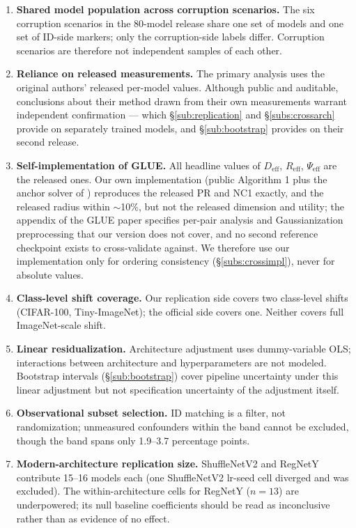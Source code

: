 \documentclass[10pt]{article} %
\newcommand{\srcref}[1]{\S\ref{#1}}
\begin{document}
\begin{enumerate}
\item \textbf{Shared model population across corruption scenarios.} The six corruption scenarios in the 80-model release share one set of models and one set of ID-side markers; only the corruption-side labels differ. Corruption scenarios are therefore not independent samples of each other.
\item \textbf{Reliance on released measurements.} The primary analysis uses the original authors' released per-model values. Although public and auditable, conclusions about their method drawn from their own measurements warrant independent confirmation --- which \srcref{sub:replication} and \srcref{subs:crossarch} provide on separately trained models, and \srcref{sub:bootstrap} provides on their second release.
\item \textbf{Self-implementation of GLUE.} All headline values of $D_{\mathrm{eff}}$, $R_{\mathrm{eff}}$, $\Psi_{\mathrm{eff}}$ are the released ones. Our own implementation (public Algorithm 1 plus the anchor solver of \citet{chung2018classification}) reproduces the released PR and NC1 exactly, and the released radius within $\sim$10\%, but not the released dimension and utility; the appendix of the GLUE paper specifies per-pair analysis and Gaussianization preprocessing that our version does not cover, and no second reference checkpoint exists to cross-validate against. We therefore use our implementation only for ordering consistency (\srcref{subs:crossimpl}), never for absolute values.
\item \textbf{Class-level shift coverage.} Our replication side covers two class-level shifts (CIFAR-100, Tiny-ImageNet); the official side covers one. Neither covers full ImageNet-scale shift.
\item \textbf{Linear residualization.} Architecture adjustment uses dummy-variable OLS; interactions between architecture and hyperparameters are not modeled. Bootstrap intervals (\srcref{sub:bootstrap}) cover pipeline uncertainty under this linear adjustment but not specification uncertainty of the adjustment itself.
\item \textbf{Observational subset selection.} ID matching is a filter, not randomization; unmeasured confounders within the band cannot be excluded, though the band spans only 1.9--3.7 percentage points.
\item \textbf{Modern-architecture replication size.} ShuffleNetV2 and RegNetY contribute 15--16 models each (one ShuffleNetV2 lr-seed cell diverged and was excluded). The within-architecture cells for RegNetY ($n=13$) are underpowered; its null baseline coefficients should be read as inconclusive rather than as evidence of no effect.

\end{enumerate}
\end{document}
